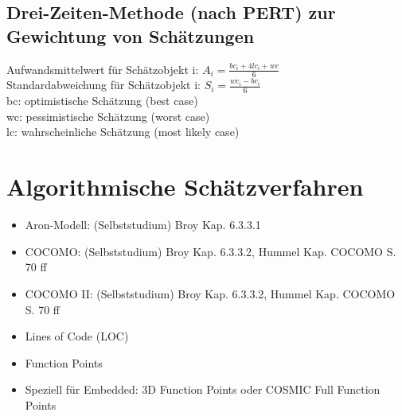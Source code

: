 \begin{figure}[hb]
	\centering
\end{figure}

\subsection{Drei-Zeiten-Methode (nach PERT) zur Gewichtung von Schätzungen}

Aufwandsmittelwert für Schätzobjekt i: $A_i = \frac{bc_i + 4 lc_i + wc}{6}$ \\
Standardabweichung für Schätzobjekt i: $S_i = \frac{wc_i - bc_i}{6}$ \\
bc: optimistische Schätzung (best case) \\
wc: pessimistische Schätzung (worst case) \\
lc: wahrscheinliche Schätzung (most likely case) 

\section{Algorithmische Schätzverfahren}

\begin{itemize}
	\item Aron-Modell: (Selbststudium) Broy Kap. 6.3.3.1
	\item COCOMO: (Selbststudium) Broy Kap. 6.3.3.2, Hummel Kap. COCOMO S. 70 ff
	\item COCOMO II: (Selbststudium) Broy Kap. 6.3.3.2, Hummel Kap. COCOMO S. 70 ff
	\item Lines of Code (LOC)
	\item Function Points
	\item Speziell für Embedded: 3D Function Points oder COSMIC Full Function Points
\end{itemize}

